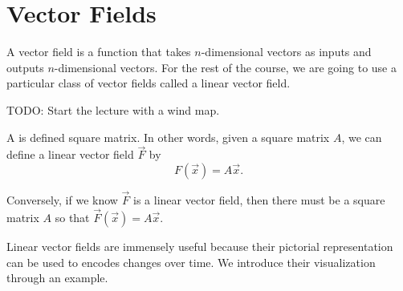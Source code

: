 \documentclass[../main.tex]{subfiles}
\begin{document}
 \section{Vector Fields}\label{sec:linalg-vector-fields}

A vector field is a function that takes \(n\)-dimensional vectors as inputs and outputs \(n\)-dimensional vectors. For the rest of the course, we are going to use a particular class of vector fields called a linear vector field.

TODO: Start the lecture with a wind map. 

\begin{definition}
  A  is defined square matrix.  In other words, given a square matrix \(A\), we can define a linear vector field \(\vec{F}\) by
  \[
    F(\vec{x}) = A \vec{x}.
  \]

  Conversely, if we know \(\vec{F}\) is a linear vector field, then there must be a square matrix \(A\) so that \(\vec{F}(\vec{x}) = A \vec{x}\).
\end{definition}

Linear vector fields are immensely useful because their pictorial representation can be used to encodes changes over time.  We introduce their visualization through an example.
\end{document}
